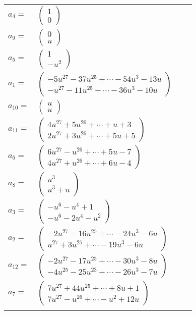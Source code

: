 \documentclass[1p]{elsarticle_modified}
\theoremstyle{definition}
\begin{document}
\begin{tabular}{m{7pt} m{180pt} m{7pt} m{180pt} }
\flushright $a_{4}=$&$\begin{pmatrix}1\\0\end{pmatrix}$ \\
\flushright $a_{9}=$&$\begin{pmatrix}0\\u\end{pmatrix}$ \\
\flushright $a_{5}=$&$\begin{pmatrix}1\\- u^2\end{pmatrix}$ \\
\flushright $a_{1}=$&$\begin{pmatrix}-5 u^{27}-37 u^{25}+\cdots-54 u^3-13 u\\- u^{27}-11 u^{25}+\cdots-36 u^3-10 u\end{pmatrix}$ \\
\flushright $a_{10}=$&$\begin{pmatrix}u\\u\end{pmatrix}$ \\
\flushright $a_{11}=$&$\begin{pmatrix}4 u^{27}+5 u^{26}+\cdots+u+3\\2 u^{27}+3 u^{26}+\cdots+5 u+5\end{pmatrix}$ \\
\flushright $a_{6}=$&$\begin{pmatrix}6 u^{27}- u^{26}+\cdots+5 u-7\\4 u^{27}+u^{26}+\cdots+6 u-4\end{pmatrix}$ \\
\flushright $a_{8}=$&$\begin{pmatrix}u^3\\u^3+u\end{pmatrix}$ \\
\flushright $a_{3}=$&$\begin{pmatrix}- u^6- u^4+1\\- u^6-2 u^4- u^2\end{pmatrix}$ \\
\flushright $a_{2}=$&$\begin{pmatrix}-2 u^{27}-16 u^{25}+\cdots-24 u^3-6 u\\u^{27}+3 u^{25}+\cdots-19 u^3-6 u\end{pmatrix}$ \\
\flushright $a_{12}=$&$\begin{pmatrix}-2 u^{27}-17 u^{25}+\cdots-30 u^3-8 u\\-4 u^{25}-25 u^{23}+\cdots-26 u^3-7 u\end{pmatrix}$ \\
\flushright $a_{7}=$&$\begin{pmatrix}7 u^{27}+44 u^{25}+\cdots+8 u+1\\7 u^{27}- u^{26}+\cdots- u^2+12 u\end{pmatrix}$\\&\end{tabular}
\end{document}

